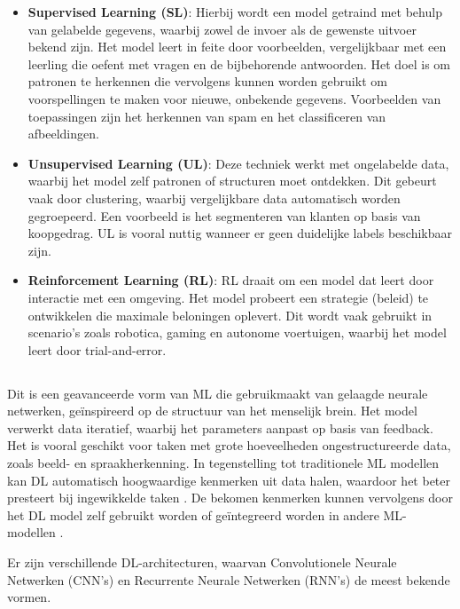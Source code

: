 \begin{itemize}
  \item \textbf{Supervised Learning (SL)}: Hierbij wordt een model getraind met behulp van gelabelde gegevens, waarbij zowel de invoer als de gewenste uitvoer bekend zijn. Het model leert in feite door voorbeelden, vergelijkbaar met een leerling die oefent met vragen en de bijbehorende antwoorden. Het doel is om patronen te herkennen die vervolgens kunnen worden gebruikt om voorspellingen te maken voor nieuwe, onbekende gegevens. Voorbeelden van toepassingen zijn het herkennen van spam en het classificeren van afbeeldingen.
  \item \textbf{Unsupervised Learning (UL)}: Deze techniek werkt met ongelabelde data, waarbij het model zelf patronen of structuren moet ontdekken. Dit gebeurt vaak door clustering, waarbij vergelijkbare data automatisch worden gegroepeerd. Een voorbeeld is het segmenteren van klanten op basis van koopgedrag. UL is vooral nuttig wanneer er geen duidelijke labels beschikbaar zijn. 
  \item \textbf{Reinforcement Learning (RL)}: RL draait om een model dat leert door interactie met een omgeving. Het model probeert een strategie (beleid) te ontwikkelen die maximale beloningen oplevert. Dit wordt vaak gebruikt in scenario's zoals robotica, gaming en autonome voertuigen, waarbij het model leert door trial-and-error. 
\end{itemize}

\subsection{}%
\label{subsec:deep-learning}

Dit is een geavanceerde vorm van ML die gebruikmaakt van gelaagde neurale netwerken, geïnspireerd op de structuur van het menselijk brein.
Het model verwerkt data iteratief, waarbij het parameters aanpast op basis van feedback.  
Het is vooral geschikt voor taken met grote hoeveelheden ongestructureerde data, zoals beeld- en spraakherkenning. 
In tegenstelling tot traditionele ML modellen kan DL automatisch hoogwaardige kenmerken uit data halen, waardoor het beter presteert bij ingewikkelde taken \autocite{SharifaniEtAl2023}.
De bekomen kenmerken kunnen vervolgens door het DL model zelf gebruikt worden of geïntegreerd worden in andere ML-modellen \autocite{JanieschEtAl2021}. 

Er zijn verschillende DL-architecturen, waarvan Convolutionele Neurale Netwerken (CNN's) en Recurrente Neurale Netwerken (RNN's) de meest bekende vormen.

